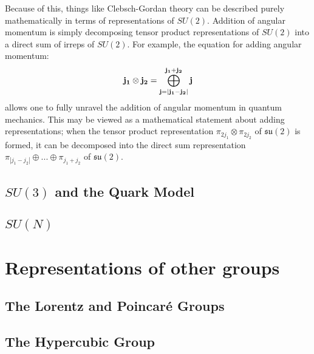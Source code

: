 \documentclass[11pt, oneside]{article}   	%
\theoremstyle{definition}
\begin{document}
Because of this, things like Clebsch-Gordan theory can be described purely mathematically in terms of representations 
of $SU(2)$. Addition of angular momentum is simply decomposing tensor product representations of $SU(2)$ into a 
direct sum of irreps of $SU(2)$. For example, the equation for adding angular momentum:
\begin{equation}
	\bf{j_1}\otimes j_2 = \bigoplus_{j = |j_1 - j_2|}^{j_1 + j_2} j
\end{equation}
allows one to fully unravel the addition of angular momentum in quantum mechanics. This may be viewed as a mathematical 
statement about adding representations; when the tensor product representation $\pi_{2j_1}\otimes\pi_{2j_2}$ of $\mathfrak{su}(2)$ 
is formed, it can be decomposed into the direct sum representation $\pi_{|j_1 - j_2|}\oplus ...\oplus\pi_{j_1 + j_2}$ of $\mathfrak{su}(2)$. 

\subsection{$SU(3)$ and the Quark Model}

\subsection{$SU(N)$}

\section{Representations of other groups}

\subsection{The Lorentz and Poincar\'{e} Groups}

\subsection{The Hypercubic Group}
\end{document}
